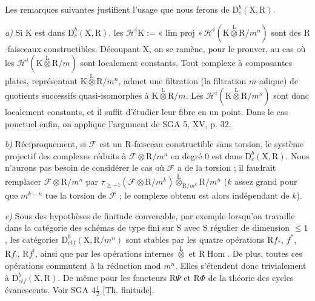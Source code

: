 \documentclass[11pt,leqno]{article}
\begin{document}
Les remarques suivantes justifient l’usage que nous ferons de \(\mathrm{D}_c^b(\mathrm{X},\mathrm{R})\).

\textit{a)} Si \(\mathrm{K}\) est dans \(\mathrm{D}_c^b(\mathrm{X},\mathrm{R})\), les \(\mathscr{H}^i\mathrm{K}:=\text{« lim proj »}\,\mathscr{H}^i(\mathrm{K}\overset{\mathrm{L}}{\otimes}\mathrm{R}/m^n)\) sont des \(\mathrm{R}\)-faisceaux constructibles. Découpant \(\mathrm{X}\), on se ramène, pour le prouver, au cas où les \(\mathscr{H}^i(\mathrm{K}\overset{\mathrm{L}}{\otimes}\mathrm{R}/m)\) sont localement constants. Tout complexe à composantes plates, représentant \(\mathrm{K}\overset{\mathrm{L}}{\otimes}\mathrm{R}/m^n\), admet une filtration (la filtration \(m\)-adique) de quotients successifs quasi-isomorphes à \(\mathrm{K}\overset{\mathrm{L}}{\otimes}\mathrm{R}/m\). Les \(\mathscr{H}^i(\mathrm{K}\overset{\mathrm{L}}{\otimes}\mathrm{R}/m^n)\) sont donc localement constants, et il suffit d’étudier leur fibre en un point. Dans le cas ponctuel enfin, on applique l’argument de SGA 5, XV, p. 32.

\textit{b)} Réciproquement, si \(\mathscr{F}\) est un \(\mathrm{R}\)-faisceau constructible sans torsion, le système projectif des complexes réduits à \(\mathscr{F}\otimes\mathrm{R}/m^n\) en degré 0 est dans \(\mathrm{D}_c^b(\mathrm{X},\mathrm{R})\). Nous n’aurons pas besoin de considérer le cas où \(\mathscr{F}\) a de la torsion ; il faudrait remplacer \(\mathscr{F}\otimes\mathrm{R}/m^n\) par \(\tau_{\geq-1}(\mathscr{F}\otimes\mathrm{R}/m^k)\overset{\mathrm{L}}{\otimes}_{\mathrm{R}/m^k}\mathrm{R}/m^n\) (\(k\) assez grand pour que \(m^{k-n}\) tue la torsion de \(\mathscr{F}\) ; le complexe obtenu est alors indépendant de \(k\)).

\textit{c)} Sous des hypothèses de finitude convenable, par exemple lorsqu’on travaille dans la catégorie des schémas de type fini sur \(\mathrm{S}\) avec \(\mathrm{S}\) régulier de dimension \(\leq1\), les catégories \(\mathrm{D}_{\mathit{ctf}}^b(\mathrm{X},\mathrm{R}/m^n)\) sont stables par les quatre opérations \(\mathrm{R}f_*\), \(f^*\), \(\mathrm{R}f_!\), \(\mathrm{R}f^!\), ainsi que par les opérations internes \(\overset{\mathrm{L}}{\otimes}\) et \(\mathrm{R}\operatorname{Hom}\). De plus, toutes ces opérations commutent à la réduction mod \(m^n\). Elles s’étendent donc trivialement à \(\mathrm{D}_{\mathit{ctf}}^b(\mathrm{X},\mathrm{R})\). De même pour les foncteurs \(\mathrm{R}\Psi\) et \(\mathrm{R}\Phi\) de la théorie des cycles évanescents. Voir SGA \(4\frac{1}{2}\) [Th. finitude].
\end{document}
